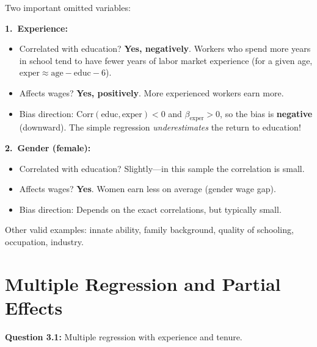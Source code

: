 \documentclass[11pt,letterpaper]{article}
\begin{document}
\begin{answer}
Two important omitted variables:

\textbf{1.\ Experience:}
\begin{itemize}[noitemsep]
\item Correlated with education? \textbf{Yes, negatively}. Workers who spend more years in school tend to have fewer years of labor market experience (for a given age, $\text{exper} \approx \text{age} - \text{educ} - 6$).
\item Affects wages? \textbf{Yes, positively}. More experienced workers earn more.
\item Bias direction: $\text{Corr}(\text{educ}, \text{exper}) < 0$ and $\beta_{\text{exper}} > 0$, so the bias is \textbf{negative} (downward). The simple regression \textit{underestimates} the return to education!
\end{itemize}

\textbf{2.\ Gender (female):}
\begin{itemize}[noitemsep]
\item Correlated with education? Slightly---in this sample the correlation is small.
\item Affects wages? \textbf{Yes}. Women earn less on average (gender wage gap).
\item Bias direction: Depends on the exact correlations, but typically small.
\end{itemize}

Other valid examples: innate ability, family background, quality of schooling, occupation, industry.
\end{answer}

\newpage

\section{Multiple Regression and Partial Effects}

\textbf{Question 3.1:} Multiple regression with experience and tenure.
\end{document}
